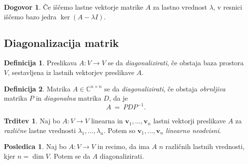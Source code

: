 \documentclass[11pt]{article}
\newcommand{\vv}{\mathbf{v}}
\newcommand{\0}{\mathbf{0}}
\theoremstyle{definition}
\newtheorem{definicija}{Definicija}[section]
\theoremstyle{definition}
\newtheorem{trditev}{Trditev}[section]
\theoremstyle{definition}
\theoremstyle{definition}
\newtheorem*{posledica}{Posledica}
\newtheorem*{dogovor}{Dogovor}
\begin{document}
\begin{dogovor}

Če iščemo lastne vektorje matrike $A$ za lastno vrednost $\lambda$, v resnici iščemo bazo jedra $\ker (A-\lambda I)$.

\end{dogovor}
\vspace{0.5cm}


\subsection{Diagonalizacija matrik}
\vspace{0.5cm}

\begin{definicija}

Preslikava $A: V \rightarrow V$ se da \textit{diagonalizirati}, če obstaja baza prostora $V$, sestavljena iz lastnih vektorjev preslikave $A$.

\end{definicija}
\vspace{0.5cm}

\begin{definicija}

Matrika $A \in \mathbb{C}^{n \times n}$ se da \textit{diagonalizirati}, če obstaja \textit{obrnljiva} matrika $P$ in \textit{diagonalna} matrika $D$, da je
$$A ~=~ PDP^{-1}.$$

\end{definicija}
\vspace{0.5cm}

\begin{trditev}

Naj bo $A: V \rightarrow V$ linearna in $\vv_1, \ldots, \vv_n$ lastni vektorji preslikave $A$ za \textit{različne} lastne vrednosti $\lambda_1, \ldots, \lambda_n$. Potem so $\vv_1, \ldots, \vv_n$ \textit{linearno neodvisni}.

\end{trditev}
\vspace{0.5cm}

\begin{posledica}

Naj bo $A: V \rightarrow V$ in recimo, da ima $A$ $n$ različnih lastnih vrednosti, kjer $n = \dim V$. Potem se da $A$ diagonalizirati.

\end{posledica}
\vspace{0.5cm}
\end{document}
